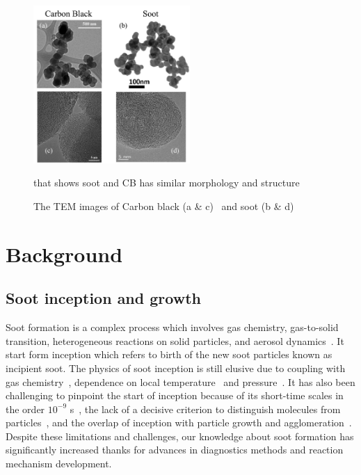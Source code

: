 \begin{figure}[!htbp]
	\centering
	\includegraphics[height=60mm, ]{Figures/Introduction/soot_CB_HRTEM.jpg}
	\caption{The TEM images of Carbon black (a \& c)~\citep{singh2018nanostructure} and soot (b \& d)~\citep{vander2007hrtem, lapuerta2017morphological}}
	\label{fig:sootCBHRTEM} that shows soot and CB has similar morphology and structure
\end{figure} 


\section{Background}
\subsection{Soot inception and growth}
Soot formation is a complex process which involves gas chemistry, gas-to-solid transition, heterogeneous reactions on solid particles, and aerosol dynamics~\citep{d2009combustion}. It start form inception which refers to birth of the new soot particles known as incipient soot. The physics of soot inception is still elusive due to coupling with gas chemistry~\cite{Wang2011}, dependence on local temperature~\citep{gleason2018effect} and pressure~\cite{gleason2021pahs}. It has also been challenging to pinpoint the start of inception because of its short-time scales in the order $10^{-9}$ s~\citep{buesser2012design}, the lack of a decisive criterion to distinguish molecules from particles~\citep{d2009combustion}, and the overlap of inception with particle growth and agglomeration~\cite{martin2022soot}. Despite these limitations and challenges, our knowledge about soot formation has significantly increased thanks for advances in diagnostics methods and reaction mechanism development. 

